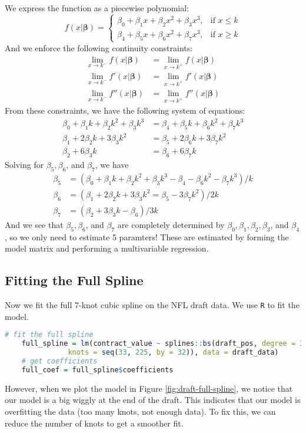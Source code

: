 \documentclass[twoside]{article}
\theoremstyle{definition}
\begin{document}
We express the function as a piecewise polynomial:
\begin{equation}
    f(x | \boldsymbol{\beta}) = \begin{cases}
        \beta_0 + \beta_1 x + \beta_2 x^2 + \beta_3 x^3, & \text{if } x \leq k \\
        \beta_4 + \beta_5 x + \beta_6 x^2 + \beta_7 x^3, & \text{if } x \geq k
    \end{cases}
\end{equation}
And we enforce the following continuity constraints:
\begin{align*}
    \lim_{x \to k^-} f(x | \boldsymbol{\beta}) &= \lim_{x \to k^+} f(x | \boldsymbol{\beta}) \\
    \lim_{x \to k^-} f'(x | \boldsymbol{\beta}) &= \lim_{x \to k^+} f'(x | \boldsymbol{\beta}) \\
    \lim_{x \to k^-} f''(x | \boldsymbol{\beta}) &= \lim_{x \to k^+} f''(x | \boldsymbol{\beta})
\end{align*}
From these constraints, we have the following system of equations:
\begin{align*}
    \beta_0 + \beta_1 k + \beta_2 k^2 + \beta_3 k^3 &= \beta_4 + \beta_5 k + \beta_6 k^2 + \beta_7 k^3 \\
    \beta_1 + 2\beta_2 k + 3\beta_3 k^2 &= \beta_5 + 2\beta_6 k + 3\beta_7 k^2 \\
    \beta_2 + 6\beta_3 k &= \beta_6 + 6\beta_7 k
\end{align*}
Solving for $\beta_5, \beta_6$, and $\beta_7$, we have
\begin{align*}
    \beta_5 &= (\beta_0 + \beta_1 k + \beta_2 k^2 + \beta_3 k^3 - \beta_4 - \beta_6 k^2 - \beta_7 k^3) / k \\
    \beta_6 &= (\beta_1 + 2 \beta_2 k + 3 \beta_3 k^2 = \beta_5 - 3\beta_7 k^2) / 2k \\
    \beta_7 &= (\beta_2 + 3 \beta_3 k - \beta_6) / 3k
\end{align*}
And we see that $\beta_5, \beta_6$, and $\beta_7$ are completely determined by $\beta_0, \beta_1, \beta_2, \beta_3$, and $\beta_4$, so we only need to estimate 5 paramters! These are estimated by forming the model matrix and performing a multivariable regression.

\subsection{Fitting the Full Spline}

Now we fit the full 7-knot cubic spline on the NFL draft data. We use \texttt{R} to fit the model.
\begin{lstlisting}[language=R]
    # fit the full spline
    full_spline = lm(contract_value ~ splines::bs(draft_pos, degree = 3,
               knots = seq(33, 225, by = 32)), data = draft_data)
    # get coefficients
    full_coef = full_spline$coefficients
\end{lstlisting}
However, when we plot the model in Figure \ref{fig:draft-full-spline}, we notice that our model is a big wiggly at the end of the draft. This indicates that our model is overfitting the data (too many knots, not enough data). To fix this, we can reduce the number of knots to get a smoother fit.
\end{document}

